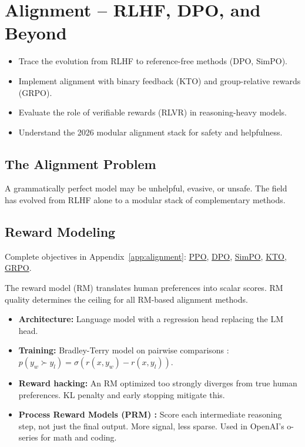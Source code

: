 \chapter{Alignment -- RLHF, DPO, and Beyond}
\minitoc

\begin{chapteroverview}
  \begin{itemize}
    \item Trace the evolution from RLHF to reference-free methods (DPO, SimPO).
    \item Implement alignment with binary feedback (KTO) and group-relative rewards (GRPO).
    \item Evaluate the role of verifiable rewards (RLVR) in reasoning-heavy models.
    \item Understand the 2026 modular alignment stack for safety and helpfulness.
  \end{itemize}
\end{chapteroverview}

\section{The Alignment Problem}

A grammatically perfect model may be unhelpful, evasive, or unsafe. The field has evolved from RLHF alone to a modular stack of complementary methods.

\section{Reward Modeling}

Complete objectives in Appendix~\ref{app:alignment}: \hyperref[form:ppo]{PPO}, \hyperref[form:dpo]{DPO}, \hyperref[form:simpo]{SimPO}, \hyperref[form:kto]{KTO}, \hyperref[form:grpo]{GRPO}.

The reward model (RM) translates human preferences into scalar scores. RM quality determines the ceiling for all RM-based alignment methods.

\begin{itemize}
  \item \textbf{Architecture:} Language model with a regression head replacing the LM head.
  \item \textbf{Training:} Bradley-Terry model on pairwise comparisons \parencite{ziegler2019finetuning}: $p(y_w \succ y_l) = \sigma(r(x, y_w) - r(x, y_l))$.
  \item \textbf{Reward hacking:} An RM optimized too strongly diverges from true human preferences. KL penalty and early stopping mitigate this.
  \item \textbf{Process Reward Models (PRM) \parencite{lightman2023lets}:} Score each intermediate reasoning step, not just the final output. More signal, less sparse. Used in OpenAI's o-series for math and coding.
\end{itemize}

